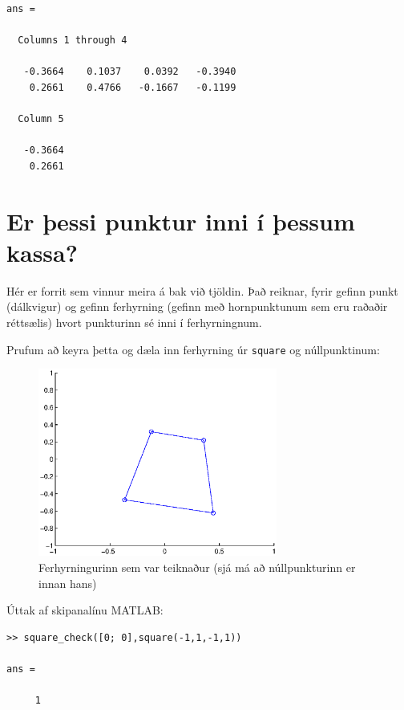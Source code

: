 \documentclass[a4]{article}
\begin{document}
\begin{flushright}
\begin{lstlisting}
ans =

  Columns 1 through 4

   -0.3664    0.1037    0.0392   -0.3940
    0.2661    0.4766   -0.1667   -0.1199

  Column 5

   -0.3664
    0.2661
\end{lstlisting}


\section{Er þessi punktur inni í þessum kassa?}

Hér er forrit sem vinnur meira á bak við tjöldin. Það reiknar, fyrir gefinn punkt (dálkvigur) og gefinn ferhyrning (gefinn með hornpunktunum sem eru raðaðir réttsælis) hvort punkturinn sé inni í ferhyrningnum.



Prufum að keyra þetta og dæla inn ferhyrning úr \lstinline{square} og núllpunktinum:

\begin{figure}[h!]
\centering
\includegraphics[width=0.7\textwidth]{sqchdaemi.eps}
\caption{Ferhyrningurinn sem var teiknaður (sjá má að núllpunkturinn er innan hans)}
\end{figure}

Úttak af skipanalínu MATLAB:

\begin{lstlisting}
>> square_check([0; 0],square(-1,1,-1,1))

ans =

     1
\end{lstlisting}


\end{flushright}
\end{document}
